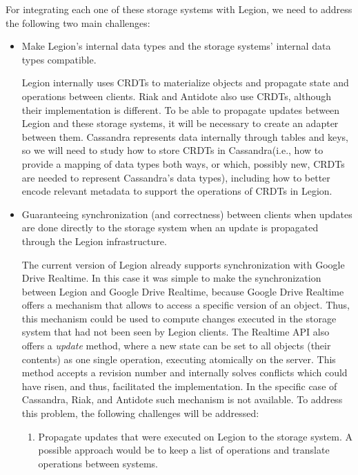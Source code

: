 For integrating each one of these storage systems with Legion, we need to address the following two main challenges:
\begin{itemize}
\item Make Legion's internal data types and the storage systems' internal data types compatible.\par
	Legion internally uses CRDTs to materialize objects and propagate state and operations between clients. Riak and Antidote also use CRDTs, although their implementation is different. To be able to propagate updates between Legion and these storage systems, it will be necessary to create an adapter  between them. Cassandra represents data internally through tables and keys, so we will need to study how to store CRDTs in Cassandra(i.e., how to provide a mapping of data types both ways, or which, possibly new, CRDTs are needed to represent Cassandra's data types), including how to better encode relevant metadata to support the operations of CRDTs in Legion.

\item Guaranteeing synchronization (and correctness) between clients when updates are done directly to the storage system when an update is propagated through the Legion infrastructure.\par
	The current version of Legion already supports synchronization with Google Drive Realtime. In this case it was simple to make the synchronization between Legion and Google Drive Realtime, because Google Drive Realtime offers a mechanism that allows to access a specific version of an object. Thus, this mechanism could be used to compute changes executed in the storage system that had not been seen by Legion clients. The Realtime API also offers a \emph{update} method, where a new state can be set to all objects (their contents) as one single operation, executing atomically on the server. This method accepts a revision number and internally solves conflicts which could have risen, and thus, facilitated the implementation. In the specific case of Cassandra, Riak, and Antidote such mechanism is not available. To address this problem, the following challenges will be addressed:
	\begin{enumerate}
	\item Propagate updates that were executed on Legion to the storage system. A possible approach would be to keep a list of operations and translate operations between systems.
	

\end{enumerate}
\end{itemize}
